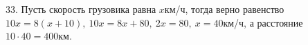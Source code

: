 33. Пусть скорость грузовика равна $x$км/ч, тогда верно равенство $10x=8(x+10),\ 10x=8x+80,\ 2x=80,\ x=40$км/ч, а расстояние $10\cdot40=400$км.\\
